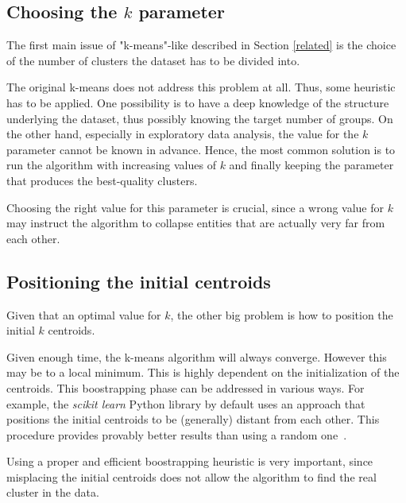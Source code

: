 \subsection*{Choosing the $k$ parameter}
The first main issue of "k-means"-like described in Section \ref{related} is the choice
of the number of clusters the dataset has to be divided into.

The original k-means does not address this problem at all. Thus, some heuristic has to
be applied. One possibility is to have a deep knowledge of the structure underlying the
dataset, thus possibly knowing the target number of groups. On the other hand, especially 
in exploratory data analysis, the value for the $k$ parameter cannot be known in advance.
Hence, the most common solution is to run the algorithm with increasing values of $k$ and
finally keeping the parameter that produces the best-quality clusters.

Choosing the right value for this parameter is crucial, since a wrong value for $k$ may
instruct the algorithm to collapse entities that are actually very far from each other.


\subsection*{Positioning the initial centroids}
Given that an optimal value for $k$, the other big problem is how to position the initial
$k$ centroids.

Given enough time, the k-means algorithm will always converge. However this may be to a local 
minimum. This is highly dependent on the initialization of the centroids. This boostrapping
phase can be addressed in various ways. For example, the \emph{scikit learn} Python library 
by default uses an approach that positions the initial centroids to be (generally) distant
from each other. This procedure provides provably better results than using a random 
one~\cite{arthur2007k}.

Using a proper and efficient boostrapping heuristic is very important, since misplacing 
the initial centroids does not allow the algorithm to find the real cluster in the data.

